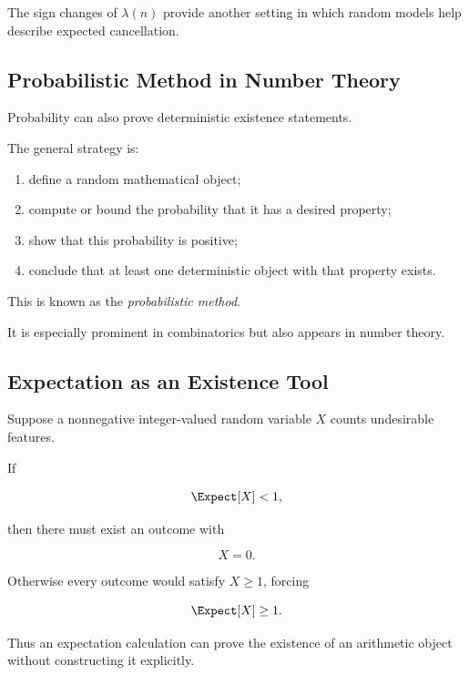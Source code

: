 The sign changes of \(\lambda(n)\) provide another setting in which random
models help describe expected cancellation.

\subsection{Probabilistic Method in Number Theory}
\label{subsec:probabilistic-method-number-theory}

Probability can also prove deterministic existence statements.

The general strategy is:

\begin{enumerate}
    \item define a random mathematical object;
    \item compute or bound the probability that it has a desired property;
    \item show that this probability is positive;
    \item conclude that at least one deterministic object with that property exists.
\end{enumerate}

This is known as the \emph{probabilistic method}.

It is especially prominent in combinatorics but also appears in number
theory.

\subsection{Expectation as an Existence Tool}
\label{subsec:expectation-existence-tool}

Suppose a nonnegative integer-valued random variable \(X\) counts undesirable
features.

If

\[ \Expect[X]<1, \]

then there must exist an outcome with

\[ X=0. \]

Otherwise every outcome would satisfy \(X\geq1\), forcing

\[ \Expect[X]\geq1. \]

Thus an expectation calculation can prove the existence of an arithmetic
object without constructing it explicitly.

